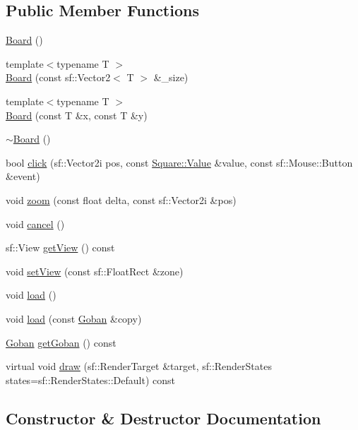 \subsection*{Public Member Functions}
\begin{DoxyCompactItemize}
\item 
\hyperlink{class_board_a9ee491d4fea680cf69b033374a9fdfcb}{Board} ()
\item 
{\footnotesize template$<$typename T $>$ }\\\hyperlink{class_board_a3ab3bc5a15b6f8fb4aa8473fed2afdcb}{Board} (const sf\+::\+Vector2$<$ T $>$ \&\+\_\+size)
\item 
{\footnotesize template$<$typename T $>$ }\\\hyperlink{class_board_abda1ce2449776e76715fc7b59c912935}{Board} (const T \&x, const T \&y)
\item 
\hyperlink{class_board_af73f45730119a1fd8f6670f53f959e68}{$\sim$\+Board} ()
\item 
bool \hyperlink{class_board_a5fda73da080403d8a71a8593d581c350}{click} (sf\+::\+Vector2i pos, const \hyperlink{class_square_a7feeec236c037a9849114226adaa4ecc}{Square\+::\+Value} \&value, const sf\+::\+Mouse\+::\+Button \&event)
\item 
void \hyperlink{class_board_a0b098808fd9214c752097a623a7c717e}{zoom} (const float delta, const sf\+::\+Vector2i \&pos)
\item 
void \hyperlink{class_board_ac7ec911a62371650afd340d1535a1742}{cancel} ()
\item 
sf\+::\+View \hyperlink{class_board_ad3c413e185668418d3a16c1fec68e70d}{get\+View} () const
\item 
void \hyperlink{class_board_afb8c7e3266134506f024b29e08fef695}{set\+View} (const sf\+::\+Float\+Rect \&zone)
\item 
void \hyperlink{class_board_a841a248dac4743611ba1825afd5d1297}{load} ()
\item 
void \hyperlink{class_board_a3cea4df16e41c21666cf51789b7e9e78}{load} (const \hyperlink{class_goban}{Goban} \&copy)
\item 
\hyperlink{class_goban}{Goban} \hyperlink{class_board_a19af96f42f5c38336010da2983abbf5c}{get\+Goban} () const
\item 
virtual void \hyperlink{class_board_a8c86104f9ff30a54cbd7520e006cd609}{draw} (sf\+::\+Render\+Target \&target, sf\+::\+Render\+States states=sf\+::\+Render\+States\+::\+Default) const
\end{DoxyCompactItemize}


\subsection{Constructor \& Destructor Documentation}
\mbox{\label{class_board_a9ee491d4fea680cf69b033374a9fdfcb}} 
